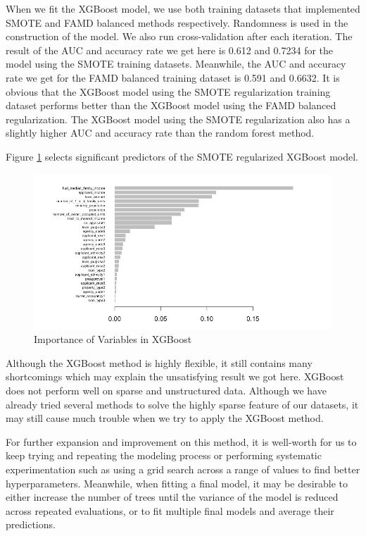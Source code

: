 \documentclass{jpp}
\begin{document}
When we fit the XGBoost model, we use both training datasets that implemented SMOTE and FAMD balanced methods respectively. Randomness is used in the construction of the model. We also run cross-validation after each iteration. The result of the AUC and accuracy rate we get here is 0.612 and 0.7234  for the model using the SMOTE training datasets. Meanwhile, the AUC and accuracy rate we get for the FAMD balanced training dataset is 0.591 and 0.6632. It is obvious that the XGBoost model using the SMOTE regularization training dataset performs better than the XGBoost model using the FAMD balanced regularization. The XGBoost model using the SMOTE regularization also has a slightly higher AUC and accuracy rate than the random forest method. 

Figure \ref{xgboost_importance} selects significant predictors of the SMOTE regularized XGBoost model.

\begin{figure}
  \centering
  \includegraphics[width=.9\linewidth]{xgboost_importance.png}
  \caption{Importance of Variables in XGBoost}
\label{xgboost_importance}
\end{figure}

Although the XGBoost method is highly flexible, it still contains many shortcomings which may explain the unsatisfying result we got here. XGBoost does not perform well on sparse and unstructured data. Although we have already tried several methods to solve the highly sparse feature of our datasets, it may still cause much trouble when we try to apply the XGBoost method. 

For further expansion and improvement on this method, it is well-worth for us to keep trying and repeating the modeling process or performing systematic experimentation such as using a grid search across a range of values to find better hyperparameters. Meanwhile, when fitting a final model, it may be desirable to either increase the number of trees until the variance of the model is reduced across repeated evaluations, or to fit multiple final models and average their predictions.
\end{document}
